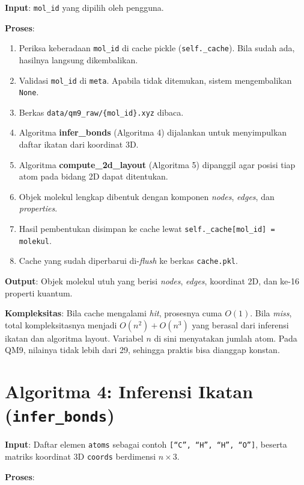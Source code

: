 \documentclass[a4paper,12pt]{report}
\begin{document}
\textbf{Input}: \texttt{mol\_id} yang dipilih oleh pengguna.

\textbf{Proses}:

\begin{enumerate}
    \item Periksa keberadaan \texttt{mol\_id} di cache pickle (\texttt{self.\_cache}). Bila sudah ada, hasilnya langsung dikembalikan.
    \item Validasi \texttt{mol\_id} di \texttt{meta}. Apabila tidak ditemukan, sistem mengembalikan \texttt{None}.
    \item Berkas \texttt{data/qm9\_raw/\{mol\_id\}.xyz} dibaca.
    \item Algoritma \textbf{infer\_bonds} (Algoritma 4) dijalankan untuk menyimpulkan daftar ikatan dari koordinat 3D.
    \item Algoritma \textbf{compute\_2d\_layout} (Algoritma 5) dipanggil agar posisi tiap atom pada bidang 2D dapat ditentukan.
    \item Objek molekul lengkap dibentuk dengan komponen \textit{nodes}, \textit{edges}, dan \textit{properties}.
    \item Hasil pembentukan disimpan ke cache lewat \texttt{self.\_cache[mol\_id] = molekul}.
    \item Cache yang sudah diperbarui di-\textit{flush} ke berkas \texttt{cache.pkl}.
\end{enumerate}

\textbf{Output}: Objek molekul utuh yang berisi \textit{nodes}, \textit{edges}, koordinat 2D, dan ke-16 properti kuantum.

\textbf{Kompleksitas}: Bila cache mengalami \textit{hit}, prosesnya cuma $O(1)$. Bila \textit{miss}, total kompleksitasnya menjadi $O(n^2) + O(n^3)$ yang berasal dari inferensi ikatan dan algoritma layout. Variabel $n$ di sini menyatakan jumlah atom. Pada QM9, nilainya tidak lebih dari 29, sehingga praktis bisa dianggap konstan.

\section{Algoritma 4: Inferensi Ikatan (\texttt{infer\_bonds})}

\textbf{Input}: Daftar elemen \texttt{atoms} sebagai contoh \texttt{[``C'', ``H'', ``H'', ``O'']}, beserta matriks koordinat 3D \texttt{coords} berdimensi $n \times 3$.

\textbf{Proses}:
\end{document}
